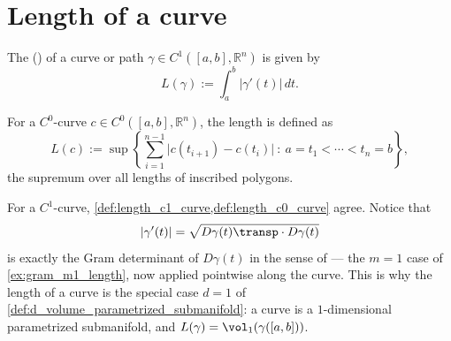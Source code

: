 
\section{Length of a curve}
\label{sec:length_of_curve}

\begin{definition}
\label{def:length_c1_curve}
The  () of a curve or path $\gamma \in
C^1([a,b],\mathbb{R}^n)$ is given by
\[L(\gamma) := \int_a^b \lvert\gamma'(t)\rvert\,dt.\]
\end{definition}

\begin{definition}
\label{def:length_c0_curve}
For a $C^0$-curve $c \in C^0([a,b],\mathbb{R}^n)$, the length is defined as
\[L(c) := \sup\left\{\sum_{i=1}^{n-1} \lvert c(t_{i+1})-c(t_i)\rvert
  \ :\ a = t_1 < \cdots < t_n = b\right\},\]
the supremum over all lengths of inscribed polygons.
\end{definition}

\begin{center}
\end{center}

\begin{remark}
For a $C^1$-curve, \cref{def:length_c1_curve,def:length_c0_curve} agree. Notice that
\[\lvert\gamma'(t)\rvert = \sqrt{D\gamma(t)\transp \cdot D\gamma(t)}\]
is exactly the Gram determinant of $D\gamma(t)$ in the sense of
 --- the $m=1$ case of \cref{ex:gram_m1_length}, now
applied pointwise along the curve. This is why the length of a curve is the special case
$d=1$ of \cref{def:d_volume_parametrized_submanifold}: a curve is a $1$-dimensional
parametrized submanifold, and $L(\gamma) = \vol_1(\gamma([a,b]))$.
\end{remark}

